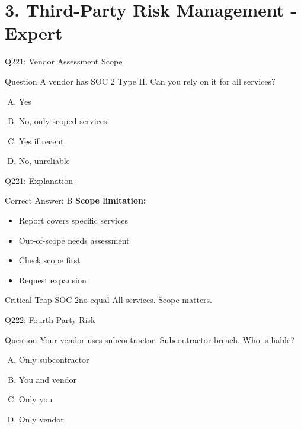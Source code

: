 \documentclass{beamer}
\begin{document}
	
	\section{3. Third-Party Risk Management - Expert}
	
	\begin{frame}{Q221: Vendor Assessment Scope}
		\begin{block}{Question}
			A vendor has SOC 2 Type II. Can you rely on it for all services?
		\end{block}
		\begin{enumerate}[(A)]
			\item Yes
			\item No, only scoped services
			\item Yes if recent
			\item No, unreliable
		\end{enumerate}
	\end{frame}
	
	\begin{frame}{Q221: Explanation}
		\begin{block}{Correct Answer: B}
			\textbf{Scope limitation:}
			\begin{itemize}
				\item Report covers specific services
				\item Out-of-scope needs assessment
				\item Check scope first
				\item Request expansion
			\end{itemize}
		\end{block}
		\begin{alertblock}{Critical Trap}
			SOC 2no equal All services.
			Scope matters.
		\end{alertblock}
	\end{frame}
	
	\begin{frame}{Q222: Fourth-Party Risk}
		\begin{block}{Question}
			Your vendor uses subcontractor. Subcontractor breach. Who is liable?
		\end{block}
		\begin{enumerate}[(A)]
			\item Only subcontractor
			\item You and vendor
			\item Only you
			\item Only vendor
		\end{enumerate}
	\end{frame}
	
\end{document}
